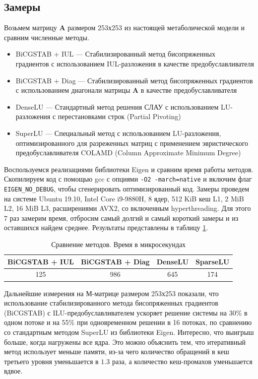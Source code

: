 \documentclass[14pt, a4paper]{extreport}
\begin{document}
\subsection{Замеры}
Возьмем матрицу $\mathbf{A}$ размером 253х253 из настоящей метаболической модели и сравним численные методы. 
\begin{itemize}
	\item BiCGSTAB + IUL --- Стабилизированный метод бисопряженных\\градиентов\cite{BiCGSTAB} с использованием IUL-разложения в качестве предобуславливателя
	\item BiCGSTAB + Diag --- Стабилизированный метод бисопряженных градиентов с использованием диагонали матрицы $\mathbf{A}$ в качестве предобуславливателя
	\item DenseLU --- Стандартный метод решения СЛАУ с использованием LU-разложения с перестановками строк (Partial Pivoting)
	\item SuperLU --- Специальный метод с использованием LU-разложения, оптимизированного для разреженных матриц\cite{SuperLU} с применением эвристического предобуславливателя COLAMD (Column Approximate Minimum Degree)\cite{COLAMD}
\end{itemize}
Воспользуемся реализациями библиотеки Eigen и сравним время работы методов. Скопилируем код с помощью gcc с опциями \texttt{-O2 -march=native} и включим флаг \texttt{EIGEN\_NO\_DEBUG}, чтобы сгенерировать оптимизированный код. Замеры проведем на системе Ubuntu 19.10, Intel Core i9-9880H, 8 ядер, 512 KiB кеш L1, 2 MiB L2, 16 MiB L3, расширениями AVX2, со включенным hyperthreading. Для этого 7 раз замерим время, отбросим самый долгий и самый короткий замеры и из оставшихся найдем среднее. Результаты представлены в таблицу \ref{methods_benchmark}.

\begin{table}[b]
	\centering
	\caption{Сравнение методов. Время в микросекундах\label{methods_benchmark}}
	\begin{tabular}{c|c|c|c}
		\hline
		BiCGSTAB + IUL & BiCGSTAB + Diag & DenseLU & SparseLU\\
		\hline
		125 & 986 & 645 & 174\\
	\end{tabular}
\end{table}

Дальнейшие измерения на М-матрице размером 253х253 показали, что использование стабилизированного метода бисопряженных градиентов\\(BiCGSTAB) с ILU-предобуславливателем ускоряет решение системы на 30\% в одном потоке и на 55\% при одновременном решении в 16 потоках, по сравнению со стандартным методом SuperLU из библиотеки Eigen. Интересно, что выигрыш больше, когда нагружены все ядра. Это можно объяснить тем, что итеративный метод использует меньше памяти, из-за чего количество обращений в кеш третьего уровня уменьшается в $1.3$ раза, а количество кеш-промахов уменьшается вдвое. 
\end{document}
